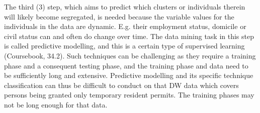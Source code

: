 The third (3) step, which aims to predict which clusters or individuals therein will likely become segregated, 
is needed because the variable values for the individuals in the data are dynamic. 
E.g. their employment status, domicile or civil status can and often do change over time. 
The data mining task in this step is called predictive modelling, and this is a certain type of supervised learning (Coursebook, 34.2). 
Such techniques can be challenging as they require a training phase and a consequent testing phase, 
and the training phase and data need to be sufficiently long and extensive. 
Predictive modelling and its specific technique classification can thus be difficult to conduct on that DW data which 
covers persons being granted only temporary resident permits. The training phases may not be long enough for that data.    